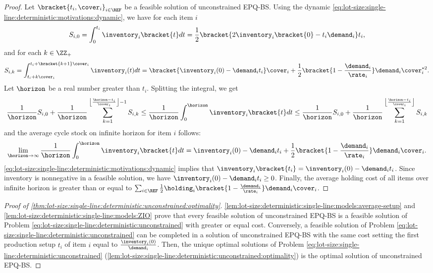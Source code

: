 \begin{proof}
Let $\bracket{t_i,\cover_i}_{i\in\REF}$ be a feasible solution of unconstrained EPQ-BS.
Using the dynamic \eqref{eq:lot-size:single-line:deterministic:motivations:dynamic}, we have for each item $i$
\begin{equation}
  S_{i,0}
  =
  \int_0^{t_i}\inventory_i\bracket{t}dt
  = \frac{1}{2}\bracket{2\inventory_i\bracket{0}-t_i\demand_i}t_i,
\end{equation}
and for each $k\in\ZZ_+$
\begin{equation}
  S_{i,k}
  =
  \int_{t_i+k\cover_i}^{t_i+\bracket{k+1}\cover_i}\inventory_i(t)dt
  =
  \bracket{\inventory_i(0)-\demand_i t_i}\cover_i
  + \frac{1}{2}\bracket{1-\frac{\demand_i}{\rate_i}}\demand_i\cover_i^{*2}.
\end{equation}
Let $\horizon$ be a real number greater than $t_i$.
Splitting the integral, we get
\begin{equation}
  \frac{1}{\horizon} S_{i,0}
  + \frac{1}{\horizon} \sum_{k=1}^{\left\lfloor\frac{\horizon-t_i}{\cover_i}\right\rfloor-1} S_{i,k}
  \le
  \frac{1}{\horizon} \int_0^{\horizon}\inventory_i\bracket{t}dt
  \le
  \frac{1}{\horizon} S_{i,0}
  + \frac{1}{\horizon} \sum_{k=1}^{\left\lfloor\frac{\horizon-t_i}{\cover_i}\right\rfloor} S_{i,k}
\end{equation}
and the average cycle stock on infinite horizon for item $i$ follows:
\begin{equation}
  \lim_{\horizon\rightarrow\infty} \frac{1}{\horizon} \int_0^{\horizon}\inventory_i\bracket{t}dt
  =
  \inventory_i(0)-\demand_i t_i
  + \frac{1}{2}\bracket{1-\frac{\demand_i}{\rate_i}}\demand_i\cover_i.
\end{equation}
\cref{eq:lot-size:single-line:deterministic:motivations:dynamic} implies that $\inventory_i\bracket{t_i}=\inventory_i(0)-\demand_i t_i$.
Since inventory is nonnegative in a feasible solution, we have $\inventory_i(0)-\demand_i t_i\ge0$.
Finally, the average holding cost of all items over infinite horizon is greater than or equal to
$\sum_{i\in\REF}\frac{1}{2}\holding_i\bracket{1-\frac{\demand_i}{\rate_i}}\demand_i\cover_i$.
\end{proof}



\begin{proof}[Proof of \cref{thm:lot-size:single-line:deterministic:unconstrained:optimality}]
\cref{lem:lot-size:deterministic:single-line:models:average-setup} and \cref{lem:lot-size:deterministic:single-line:models:ZIO} prove that every feasible solution of unconstrained EPQ-BS is a feasible solution of Problem \ref{eq:lot-size:single-line:deterministic:unconstrained} with greater or equal cost.
Conversely, a feasible solution of Problem \ref{eq:lot-size:single-line:deterministic:unconstrained} can be completed in a solution of unconstrained EPQ-BS with the same cost setting the first production setup $t_i$ of item $i$ equal to $\frac{\inventory_i(0)}{\demand_i}$.
Then, the unique optimal solutions of Problem \ref{eq:lot-size:single-line:deterministic:unconstrained} (\cref{lem:lot-size:single-line:deterministic:unconstrained:optimality}) is the optimal solution of unconstrained EPQ-BS.
\end{proof}


